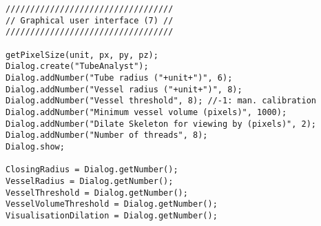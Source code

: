 \begin{lstlisting}
//////////////////////////////////
// Graphical user interface (7) //
//////////////////////////////////

getPixelSize(unit, px, py, pz);
Dialog.create("TubeAnalyst");
Dialog.addNumber("Tube radius ("+unit+")", 6);
Dialog.addNumber("Vessel radius ("+unit+")", 8);
Dialog.addNumber("Vessel threshold", 8); //-1: man. calibration  
Dialog.addNumber("Minimum vessel volume (pixels)", 1000);
Dialog.addNumber("Dilate Skeleton for viewing by (pixels)", 2);
Dialog.addNumber("Number of threads", 8);
Dialog.show;

ClosingRadius = Dialog.getNumber();
VesselRadius = Dialog.getNumber();  
VesselThreshold = Dialog.getNumber();
VesselVolumeThreshold = Dialog.getNumber();
VisualisationDilation = Dialog.getNumber();

\end{lstlisting}